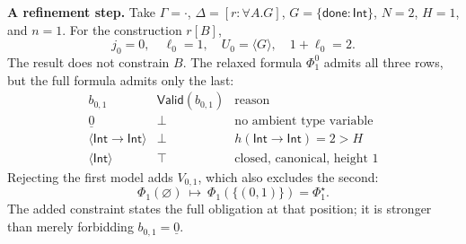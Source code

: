 \documentclass[10pt,a4paper]{article}
\newcommand{\Int}{\mathsf{Int}}
\newcommand{\kw}[1]{\mathsf{#1}}
\begin{document}
\textbf{A refinement step.}
Take $\Gamma=\cdot$, $\Delta=[r:\forall A.G]$, $G=\{\kw{done}:\Int\}$,
$N=2$, $H=1$, and $n=1$. For the construction $r[B]$,
\[
 j_0=0,\quad\ell_0=1,\quad U_0=\langle G\rangle,\quad
 1+\ell_0=2.
\]
The result does not constrain $B$. The relaxed formula $\Phi_1^0$ admits all three
rows, but the full formula admits only the last:
\[
\begin{array}{c|c|c}
 b_{0,1} & \mathsf{Valid}(b_{0,1}) & \text{reason}\\ \hline
 \underline 0 & \bot & \text{no ambient type variable}\\
 \langle\Int\to\Int\rangle & \bot & h(\Int\to\Int)=2>H\\
 \langle\Int\rangle & \top & \text{closed, canonical, height }1
\end{array}
\]
Rejecting the first model adds $V_{0,1}$, which also excludes the second:
\[
 \Phi_1(\varnothing)\ \longmapsto\
 \Phi_1(\{(0,1)\})=\Phi_1^\star.
\]
The added constraint states the full obligation at that position; it is stronger
than merely forbidding $b_{0,1}=\underline0$.
\end{document}
